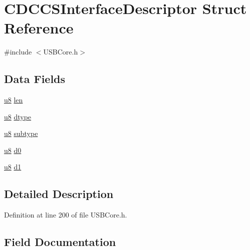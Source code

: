 \hypertarget{struct_c_d_c_c_s_interface_descriptor}{}\section{C\+D\+C\+C\+S\+Interface\+Descriptor Struct Reference}
\label{struct_c_d_c_c_s_interface_descriptor}


{\ttfamily \#include $<$U\+S\+B\+Core.\+h$>$}

\subsection*{Data Fields}
\begin{DoxyCompactItemize}
\item 
\hyperlink{_u_s_b_a_p_i_8h_aed742c436da53c1080638ce6ef7d13de}{u8} \hyperlink{struct_c_d_c_c_s_interface_descriptor_afbf3f3230446569534d5f466aaf4c23b}{len}
\item 
\hyperlink{_u_s_b_a_p_i_8h_aed742c436da53c1080638ce6ef7d13de}{u8} \hyperlink{struct_c_d_c_c_s_interface_descriptor_a0bb419531ec75697e63e9109fecf81b0}{dtype}
\item 
\hyperlink{_u_s_b_a_p_i_8h_aed742c436da53c1080638ce6ef7d13de}{u8} \hyperlink{struct_c_d_c_c_s_interface_descriptor_afb82dd1313bc5284e4e5aef8218ef414}{subtype}
\item 
\hyperlink{_u_s_b_a_p_i_8h_aed742c436da53c1080638ce6ef7d13de}{u8} \hyperlink{struct_c_d_c_c_s_interface_descriptor_a3e359aaf0f33f4eeedb3f26e73ac1cc7}{d0}
\item 
\hyperlink{_u_s_b_a_p_i_8h_aed742c436da53c1080638ce6ef7d13de}{u8} \hyperlink{struct_c_d_c_c_s_interface_descriptor_ac1f3ea17c85c96dbc7ec1dba968be24f}{d1}
\end{DoxyCompactItemize}


\subsection{Detailed Description}


Definition at line 200 of file U\+S\+B\+Core.\+h.



\subsection{Field Documentation}
\hypertarget{struct_c_d_c_c_s_interface_descriptor_a3e359aaf0f33f4eeedb3f26e73ac1cc7}{}
